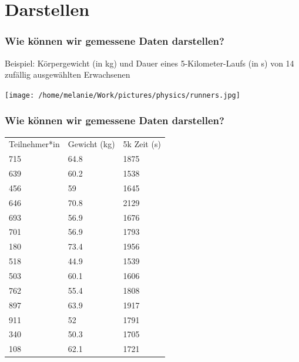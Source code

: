 \documentclass{beamer}
\begin{document}
\section{Darstellen}

\begin{frame}
\frametitle{Wie können wir gemessene Daten darstellen?}

Beispiel: Körpergewicht (in kg) und Dauer eines 5-Kilometer-Laufs (in s) von 14 zufällig ausgewählten Erwachsenen
 
\begin{center}
\texttt{[image: /home/melanie/Work/pictures/physics/runners.jpg]}
\end{center}

\end{frame}

\begin{frame}

\frametitle{Wie können wir gemessene Daten darstellen?}


\begin{tabular}{lll}
Teilnehmer*in   & Gewicht (kg)  &  5k Zeit (s)  \\
715 &	64.8 &	1875  \\
639 &	60.2 &	1538 \\
456 &	59 &	1645 \\
646 &	70.8 &	2129 \\
693 &	56.9 &	1676 \\
701 &	56.9 &	1793 \\
180 &	73.4 &	1956 \\
518 &	44.9 &	1539 \\
503 &	60.1 &	1606 \\
762 &	55.4 &	1808 \\
897 &	63.9 &	1917 \\
911 &	52 &	1791 \\
340 &	50.3 &	1705 \\
108 &	62.1 &	1721 \\
\end{tabular}



\end{frame}
\end{document}
